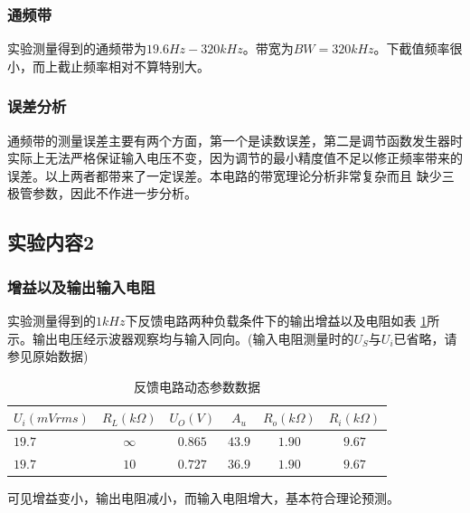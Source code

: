 \documentclass[a4paper,11pt,UTF8]{ctexart}
\begin{document}
    \subsubsection{通频带}
    实验测量得到的通频带为$19.6Hz-320kHz$。带宽为$BW=320kHz$。下截值频率很小，而上截止频率相对不算特别大。
    \subsubsection{误差分析}
    通频带的测量误差主要有两个方面，第一个是读数误差，第二是调节函数发生器时实际上无法严格保证输入电压不变，因为调节的最小精度值不足以修正频率带来的误差。以上两者都带来了一定误差。本电路的带宽理论分析非常复杂而且
    缺少三极管参数，因此不作进一步分析。
  \subsection{实验内容2}
  \subsubsection{增益以及输出输入电阻}
  实验测量得到的$1kHz$下反馈电路两种负载条件下的输出增益以及电阻如表 \ref{tab:tab3}所示。输出电压经示波器观察均与输入同向。(输入电阻测量时的$U_S$与$U_i$已省略，请参见原始数据)
  \begin{table}[!h!tbp]
    \caption{反馈电路动态参数数据}\label{tab:tab3}
      \centering
      \begin{tabular}{|l|c|c|c|c|c|}
      \hline
      $U_i(mVrms)$  &$R_L(k\Omega)$  &$U_O(V)$  &$A_u$   &$R_o(k\Omega)$  &$R_{i}(k\Omega)$         \\ \hline
      $19.7$        &$\infty$        &$0.865$   &$43.9$  &$1.90$          &$9.67$\\ \hline
      $19.7$        &$10$            &$0.727$   &$36.9$  &$1.90$          &$9.67$\\ \hline
    \end{tabular}
    \end{table}
  可见增益变小，输出电阻减小，而输入电阻增大，基本符合理论预测。
\end{document}
